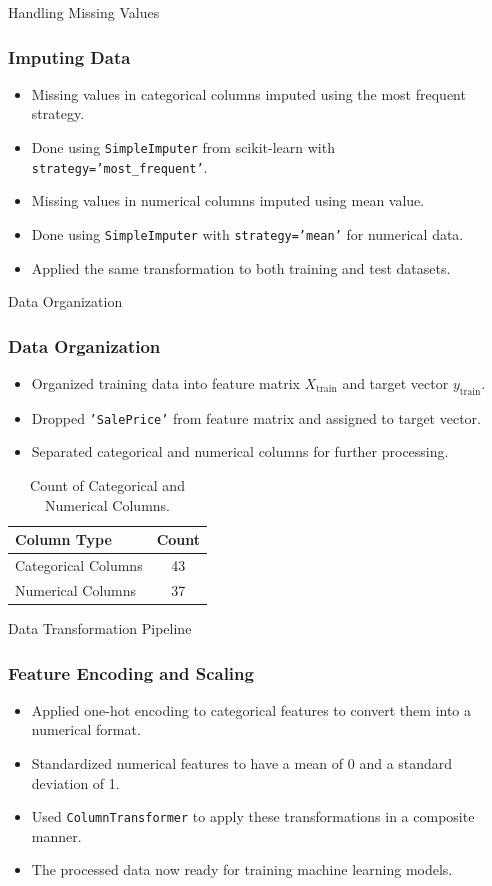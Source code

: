 \begin{frame}{Handling Missing Values}
    \frametitle{Imputing Data}
    \begin{itemize}
        \item Missing values in categorical columns imputed using the most frequent strategy.
        \item Done using \texttt{SimpleImputer} from scikit-learn with \texttt{strategy='most\_frequent'}.
        \item Missing values in numerical columns imputed using mean value.
        \item Done using \texttt{SimpleImputer} with \texttt{strategy='mean'} for numerical data.
        \item Applied the same transformation to both training and test datasets.
    \end{itemize}
\end{frame}

\begin{frame}{Data Organization}
    \frametitle{Data Organization}
    \begin{itemize}
        \item Organized training data into feature matrix \(X_{\text{train}}\) and target vector \(y_{\text{train}}\).
        \item Dropped \texttt{'SalePrice'} from feature matrix and assigned to target vector.
        \item Separated categorical and numerical columns for further processing.
    \end{itemize}
    \begin{table}[H]
        \centering
        \small
        \begin{tabular}{|l|c|}
        \hline
        \textbf{Column Type} & \textbf{Count} \\
        \hline
        Categorical Columns & 43 \\
        Numerical Columns & 37 \\
        \hline
        \end{tabular}
        \caption{Count of Categorical and Numerical Columns.}
        \label{tab:column_counts}
    \end{table}
\end{frame}

\begin{frame}{Data Transformation Pipeline}
    \frametitle{Feature Encoding and Scaling}
    \begin{itemize}
        \item Applied one-hot encoding to categorical features to convert them into a numerical format.
        \item Standardized numerical features to have a mean of 0 and a standard deviation of 1.
        \item Used \texttt{ColumnTransformer} to apply these transformations in a composite manner.
        \item The processed data now ready for training machine learning models.
    \end{itemize}
\end{frame}

